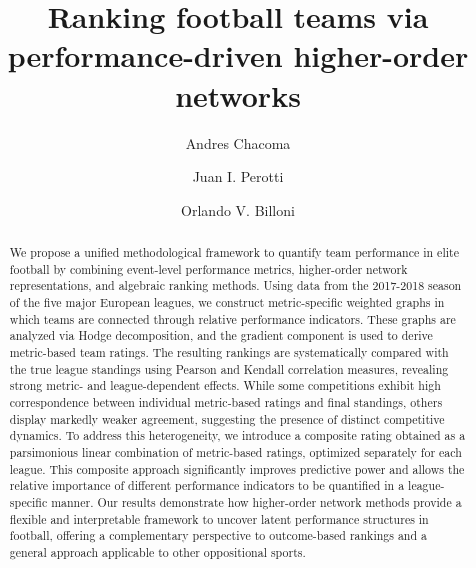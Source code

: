 \documentclass[preprint, amsmath,amssymb, pre]{revtex4-2}
\begin{document}
\title{Ranking football teams via performance-driven higher-order networks}


\author{Andres Chacoma}

\author{Juan I. Perotti}

\author{Orlando V. Billoni}


\begin{abstract}
We propose a unified methodological framework to quantify team performance in elite football by combining event-level performance metrics, higher-order network representations, and algebraic ranking methods. Using data from the 2017-2018 season of the five major European leagues, we construct metric-specific weighted graphs in which teams are connected through relative performance indicators. These graphs are analyzed via Hodge decomposition, and the gradient component is used to derive metric-based team ratings. The resulting rankings are systematically compared with the true league standings using Pearson and Kendall correlation measures, revealing strong metric- and league-dependent effects. While some competitions exhibit high correspondence between individual metric-based ratings and final standings, others display markedly weaker agreement, suggesting the presence of distinct competitive dynamics. To address this heterogeneity, we introduce a composite rating obtained as a parsimonious linear combination of metric-based ratings, optimized separately for each league. This composite approach significantly improves predictive power and allows the relative importance of different performance indicators to be quantified in a league-specific manner. Our results demonstrate how higher-order network methods provide a flexible and interpretable framework to uncover latent performance structures in football, offering a complementary perspective to outcome-based rankings and a general approach applicable to other oppositional sports.
\end{abstract}
\end{document}
